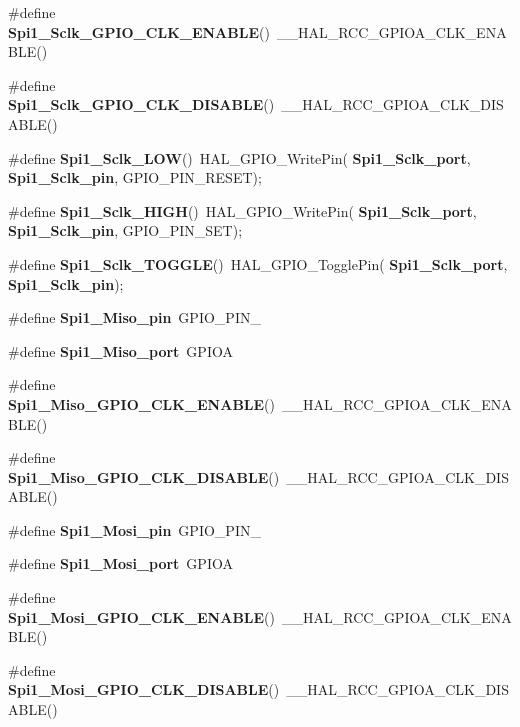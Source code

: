 \begin{DoxyCompactItemize}
\item 
\#define \textbf{ Spi1\+\_\+\+Sclk\+\_\+\+G\+P\+I\+O\+\_\+\+C\+L\+K\+\_\+\+E\+N\+A\+B\+LE}()~\+\_\+\+\_\+\+H\+A\+L\+\_\+\+R\+C\+C\+\_\+\+G\+P\+I\+O\+A\+\_\+\+C\+L\+K\+\_\+\+E\+N\+A\+B\+LE()
\item 
\#define \textbf{ Spi1\+\_\+\+Sclk\+\_\+\+G\+P\+I\+O\+\_\+\+C\+L\+K\+\_\+\+D\+I\+S\+A\+B\+LE}()~\+\_\+\+\_\+\+H\+A\+L\+\_\+\+R\+C\+C\+\_\+\+G\+P\+I\+O\+A\+\_\+\+C\+L\+K\+\_\+\+D\+I\+S\+A\+B\+LE()
\item 
\#define \textbf{ Spi1\+\_\+\+Sclk\+\_\+\+L\+OW}()~H\+A\+L\+\_\+\+G\+P\+I\+O\+\_\+\+Write\+Pin(\textbf{ Spi1\+\_\+\+Sclk\+\_\+port},\textbf{ Spi1\+\_\+\+Sclk\+\_\+pin}, G\+P\+I\+O\+\_\+\+P\+I\+N\+\_\+\+R\+E\+S\+ET);
\item 
\#define \textbf{ Spi1\+\_\+\+Sclk\+\_\+\+H\+I\+GH}()~H\+A\+L\+\_\+\+G\+P\+I\+O\+\_\+\+Write\+Pin(\textbf{ Spi1\+\_\+\+Sclk\+\_\+port},\textbf{ Spi1\+\_\+\+Sclk\+\_\+pin}, G\+P\+I\+O\+\_\+\+P\+I\+N\+\_\+\+S\+ET);
\item 
\#define \textbf{ Spi1\+\_\+\+Sclk\+\_\+\+T\+O\+G\+G\+LE}()~H\+A\+L\+\_\+\+G\+P\+I\+O\+\_\+\+Toggle\+Pin(\textbf{ Spi1\+\_\+\+Sclk\+\_\+port},\textbf{ Spi1\+\_\+\+Sclk\+\_\+pin});
\item 
\#define \textbf{ Spi1\+\_\+\+Miso\+\_\+pin}~G\+P\+I\+O\+\_\+\+P\+I\+N\+\_
\item 
\#define \textbf{ Spi1\+\_\+\+Miso\+\_\+port}~G\+P\+I\+OA
\item 
\#define \textbf{ Spi1\+\_\+\+Miso\+\_\+\+G\+P\+I\+O\+\_\+\+C\+L\+K\+\_\+\+E\+N\+A\+B\+LE}()~\+\_\+\+\_\+\+H\+A\+L\+\_\+\+R\+C\+C\+\_\+\+G\+P\+I\+O\+A\+\_\+\+C\+L\+K\+\_\+\+E\+N\+A\+B\+LE()
\item 
\#define \textbf{ Spi1\+\_\+\+Miso\+\_\+\+G\+P\+I\+O\+\_\+\+C\+L\+K\+\_\+\+D\+I\+S\+A\+B\+LE}()~\+\_\+\+\_\+\+H\+A\+L\+\_\+\+R\+C\+C\+\_\+\+G\+P\+I\+O\+A\+\_\+\+C\+L\+K\+\_\+\+D\+I\+S\+A\+B\+LE()
\item 
\#define \textbf{ Spi1\+\_\+\+Mosi\+\_\+pin}~G\+P\+I\+O\+\_\+\+P\+I\+N\+\_
\item 
\#define \textbf{ Spi1\+\_\+\+Mosi\+\_\+port}~G\+P\+I\+OA
\item 
\#define \textbf{ Spi1\+\_\+\+Mosi\+\_\+\+G\+P\+I\+O\+\_\+\+C\+L\+K\+\_\+\+E\+N\+A\+B\+LE}()~\+\_\+\+\_\+\+H\+A\+L\+\_\+\+R\+C\+C\+\_\+\+G\+P\+I\+O\+A\+\_\+\+C\+L\+K\+\_\+\+E\+N\+A\+B\+LE()
\item 
\#define \textbf{ Spi1\+\_\+\+Mosi\+\_\+\+G\+P\+I\+O\+\_\+\+C\+L\+K\+\_\+\+D\+I\+S\+A\+B\+LE}()~\+\_\+\+\_\+\+H\+A\+L\+\_\+\+R\+C\+C\+\_\+\+G\+P\+I\+O\+A\+\_\+\+C\+L\+K\+\_\+\+D\+I\+S\+A\+B\+LE()

\end{DoxyCompactItemize}
